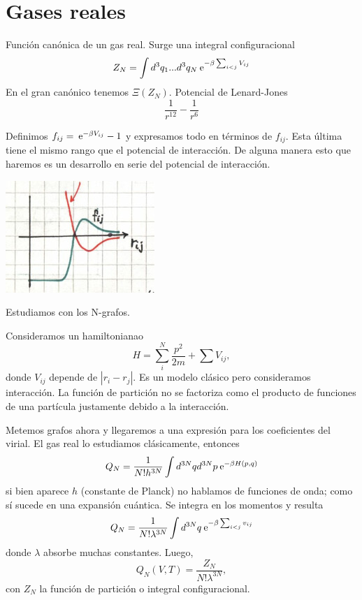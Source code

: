 \documentclass[10pt,oneside]{CBFT_book}
\begin{document}
\section{Gases reales}

Función canónica de un gas real. Surge una integral configuracional
\[
	Z_N =  \int d^3q_1 ... d^3q_N \:\mathrm{e}^{ - \beta \sum_{i<j} V_{ij} }
\]
En el gran canónico tenemos $ \Xi( Z_N ) $. Potencial de Lenard-Jones
\[
	\frac{1}{r^{12}} - \frac{1}{r^{6}}
\]

Definimos $ f_{ij} = \:\mathrm{e}^{-\beta V_{ij}} - 1 $ y expresamos todo en términos de $ f_{ij} $.
Esta última tiene el mismo rango que el potencial de interacción.
De alguna manera esto que haremos es un desarrollo en serie del potencial de interacción.

\includegraphics[scale=0.5]{images/1606329591.jpg}

Estudiamos con los N-grafos.

Consideramos un hamiltonianao
\[
	H = \sum_i^N \frac{ p^2 }{2m} + \sum V_{ij},
\]
donde $V_{ij}$ depende de $|r_i-r_j|$. Es un modelo clásico pero consideramos interacción.
La función de partición no se factoriza como el producto de funciones de una partícula justamente
debido a la interacción.

Metemos grafos ahora y llegaremos a una expresión para los coeficientes del virial.
El gas real lo estudiamos clásicamente, entonces 
\[
	Q_N = \frac{1}{N! h^{3N} } \int  d^{3N}q d^{3N}p  \:\mathrm{e}^{ - \beta H(p,q) }
\]
si bien aparece $h$ (constante de Planck) no hablamos de funciones de onda; como sí sucede en una
expansión cuántica.
Se integra en los momentos y resulta
\[
	Q_N = \frac{1}{N! \lambda^{3N} } \int  d^{3N}q  \:\mathrm{e}^{ - \beta \sum_{i<j} v_{ij} }
\]
donde $\lambda$ absorbe muchas constantes. Luego,
\[
	Q_N(V,T) = \frac{ Z_N }{ N! \lambda^{3N}},
\]
con $ Z_N $ la función de partición o integral configuracional.
\end{document}
